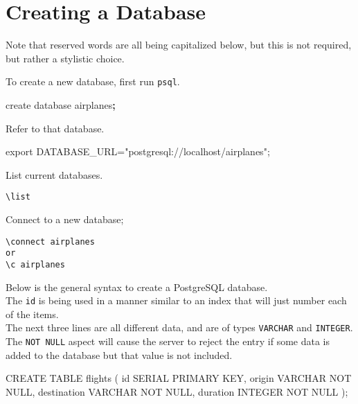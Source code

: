 \documentclass[]{book}
\newenvironment{Shaded}{\begin{snugshade}}{\end{snugshade}}
\newcommand{\BuiltInTok}[1]{#1}
\newcommand{\ExtensionTok}[1]{#1}
\newcommand{\FunctionTok}[1]{\textcolor[rgb]{0.00,0.00,0.00}{#1}}
\newcommand{\KeywordTok}[1]{\textcolor[rgb]{0.13,0.29,0.53}{\textbf{#1}}}
\newcommand{\NormalTok}[1]{#1}
\newcommand{\StringTok}[1]{\textcolor[rgb]{0.31,0.60,0.02}{#1}}
\newcommand{\VariableTok}[1]{\textcolor[rgb]{0.00,0.00,0.00}{#1}}
\begin{document}
\hypertarget{creating-a-database}{%
\section{Creating a Database}\label{creating-a-database}}

Note that reserved words are all being capitalized below, but this is not required, but rather a stylistic choice.

To create a new database, first run \texttt{psql}.

\begin{Shaded}
\begin{Highlighting}[]
\ExtensionTok{create}\NormalTok{ database airplanes}\KeywordTok{;}
\end{Highlighting}
\end{Shaded}

Refer to that database.

\begin{Shaded}
\begin{Highlighting}[]
\BuiltInTok{export} \VariableTok{DATABASE_URL=}\StringTok{"postgresql://localhost/airplanes"}\NormalTok{;}
\end{Highlighting}
\end{Shaded}

List current databases.

\begin{verbatim}
\list
\end{verbatim}

Connect to a new database;

\begin{verbatim}
\connect airplanes
or
\c airplanes
\end{verbatim}

Below is the general syntax to create a PostgreSQL database.\\
The \texttt{id} is being used in a manner similar to an index that will just number each of the items.\\
The next three lines are all different data, and are of types \texttt{VARCHAR} and \texttt{INTEGER}.\\
The \texttt{NOT\ NULL} aspect will cause the server to reject the entry if some data is added to the database but that value is not included.

\begin{Shaded}
\begin{Highlighting}[]
\ExtensionTok{CREATE}\NormalTok{ TABLE flights (           }
    \FunctionTok{id}\NormalTok{ SERIAL PRIMARY KEY,       }
    \ExtensionTok{origin}\NormalTok{ VARCHAR NOT NULL,     }
    \ExtensionTok{destination}\NormalTok{ VARCHAR NOT NULL,}
    \ExtensionTok{duration}\NormalTok{ INTEGER NOT NULL    }
\NormalTok{);                               }
\end{Highlighting}
\end{Shaded}
\end{document}

